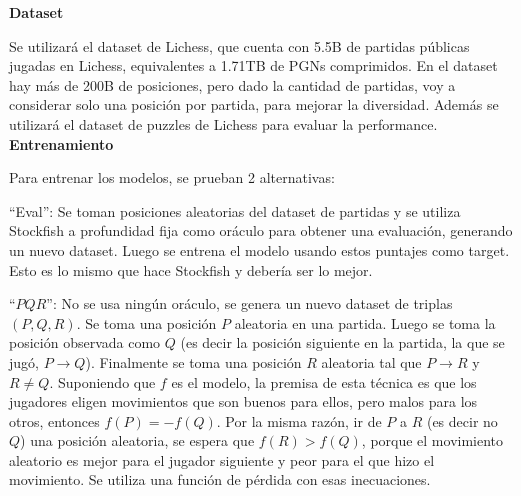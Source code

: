 \textbf{Dataset}

Se utilizará el dataset de Lichess, que cuenta con 5.5B de partidas públicas jugadas en Lichess, equivalentes a 1.71TB de PGNs comprimidos. En el dataset hay más de 200B de posiciones, pero dado la cantidad de partidas, voy a considerar solo una posición por partida, para mejorar la diversidad. Además se utilizará el dataset de puzzles de Lichess para evaluar la performance. \\

\textbf{Entrenamiento}

Para entrenar los modelos, se prueban 2 alternativas:

``Eval'': Se toman posiciones aleatorias del dataset de partidas y se utiliza Stockfish a profundidad fija como oráculo para obtener una evaluación, generando un nuevo dataset. Luego se entrena el modelo usando estos puntajes como target. Esto es lo mismo que hace Stockfish y debería ser lo mejor.

``$PQR$'': No se usa ningún oráculo, se genera un nuevo dataset de triplas $(P,Q,R)$. Se toma una posición $P$ aleatoria en una partida. Luego se toma la posición observada como $Q$ (es decir la posición siguiente en la partida, la que se jugó, $P \rightarrow Q$). Finalmente se toma una posición $R$ aleatoria tal que $P \rightarrow R$ y $R \neq Q$. Suponiendo que $f$ es el modelo, la premisa de esta técnica es que los jugadores eligen movimientos que son buenos para ellos, pero malos para los otros, entonces $f(P)=-f(Q)$. Por la misma razón, ir de $P$ a $R$ (es decir no $Q$) una posición aleatoria, se espera que $f(R) > f(Q)$, porque el movimiento aleatorio es mejor para el jugador siguiente y peor para el que hizo el movimiento. Se utiliza una función de pérdida con esas inecuaciones.
